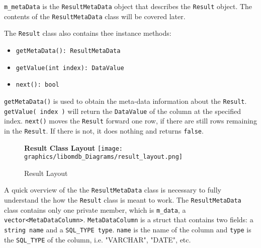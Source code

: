 \documentclass[letterpaper, 12pt]{article}
\renewcommand{\includegraphics}[2][]{\fbox{}}
\begin{document}
  \lstinline[basicstyle=\ttfamily]|m_metaData| is the 
  \lstinline[basicstyle=\ttfamily]|ResultMetaData| object that describes the 
  \lstinline[basicstyle=\ttfamily]|Result| object. The contents of the 
  \lstinline[basicstyle=\ttfamily]|ResultMetaData| class will be covered later.
  \par\vspace{\baselineskip}
  The \lstinline[basicstyle=\ttfamily]|Result| class also contains thee instance methods:
  \begin{itemize}
    \item \lstinline[basicstyle=\ttfamily]|getMetaData(): ResultMetaData|
    \item \lstinline[basicstyle=\ttfamily]|getValue(int index): DataValue|
    \item \lstinline[basicstyle=\ttfamily]|next(): bool|
  \end{itemize}
  \lstinline[basicstyle=\ttfamily]|getMetaData()| is used to obtain the meta-data 
  information about the \lstinline[basicstyle=\ttfamily]|Result|. 
  \lstinline[basicstyle=\ttfamily]|getValue( index )| will return the 
  \lstinline[basicstyle=\ttfamily]|DataValue| of the column at the specified index.
  \lstinline[basicstyle=\ttfamily]|next()| moves the 
  \lstinline[basicstyle=\ttfamily]|Result| forward one row, if there are still rows 
  remaining in the \lstinline[basicstyle=\ttfamily]|Result|. If there is not, it does 
  nothing and returns \lstinline[basicstyle=\ttfamily]|false|.
  
  \begin{figure}
    \centering
    \textbf{Result Class Layout}
    \texttt{[image: graphics/libomdb\_Diagrams/result\_layout.png]}
    \caption{Result Layout}
  \end{figure}
  \par\vspace{\baselineskip}
  A quick overview of the the \lstinline[basicstyle=\ttfamily]|ResultMetaData| class 
  is necessary to fully understand the how the 
  \lstinline[basicstyle=\ttfamily]|Result| class is meant to work. 
  The \lstinline[basicstyle=\ttfamily]|ResultMetaData| class contains only one 
  private member, which is 
  \lstinline[basicstyle=\ttfamily]|m_data|, a 
  \lstinline[basicstyle=\ttfamily]|vector<MetaDataColumn>|. 
  \lstinline[basicstyle=\ttfamily]|MetaDataColumn| is a struct that contains two fields: 
  a \lstinline[basicstyle=\ttfamily]|string name| and a 
  \lstinline[basicstyle=\ttfamily]|SQL_TYPE type|. \lstinline[basicstyle=\ttfamily]|name|
  is the name of the column and \lstinline[basicstyle=\ttfamily]|type| is the 
  \lstinline[basicstyle=\ttfamily]|SQL_TYPE| of the column, i.e. "VARCHAR", "DATE", etc.
  
\end{document}
